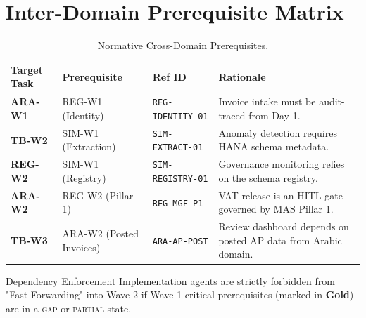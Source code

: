 \documentclass[11pt,a4paper,twoside]{report}
\begin{document}
\section{Inter-Domain Prerequisite Matrix}

\begin{table}[htbp]
\centering
\footnotesize
\caption{Normative Cross-Domain Prerequisites.}
\label{tab:prerequisites}
\begin{tabularx}{\textwidth}{@{}l l l X@{}}
\toprule
\textbf{Target Task} & \textbf{Prerequisite} & \textbf{Ref ID} & \textbf{Rationale} \\
\midrule
\rowcolor{sapmidnight!5}
\textbf{ARA-W1} & REG-W1 (Identity) & \texttt{REG-IDENTITY-01} & Invoice intake must be audit-traced from Day 1. \\
\textbf{TB-W2}  & SIM-W1 (Extraction) & \texttt{SIM-EXTRACT-01} & Anomaly detection requires HANA schema metadata. \\
\rowcolor{sapmidnight!5}
\textbf{REG-W2} & SIM-W1 (Registry) & \texttt{SIM-REGISTRY-01} & Governance monitoring relies on the schema registry. \\
\textbf{ARA-W2} & REG-W2 (Pillar 1) & \texttt{REG-MGF-P1} & VAT release is an HITL gate governed by MAS Pillar 1. \\
\rowcolor{sapmidnight!5}
\textbf{TB-W3}  & ARA-W2 (Posted Invoices) & \texttt{ARA-AP-POST} & Review dashboard depends on posted AP data from Arabic domain. \\
\bottomrule
\end{tabularx}
\end{table}

\begin{adrbox}{Dependency Enforcement}
Implementation agents are strictly forbidden from "Fast-Forwarding" into Wave 2 if Wave 1 critical prerequisites (marked in \textcolor{sapamber}{\textbf{Gold}}) are in a \textsc{gap} or \textsc{partial} state.
\end{adrbox}
\end{document}
